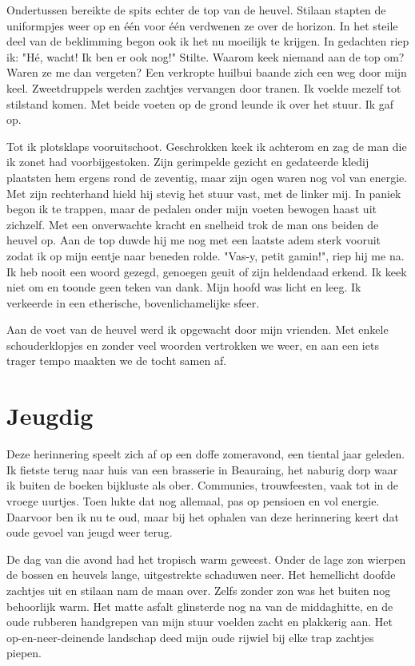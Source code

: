 \documentclass[12pt, justified, a4paper, symmetric]{tufte-book}
\begin{document}
Ondertussen bereikte de spits echter de top van de heuvel. Stilaan stapten de uniformpjes weer op en \'e\'en voor \'e\'en verdwenen ze over de horizon. In het steile deel van de beklimming begon ook ik het nu moeilijk te krijgen. In gedachten riep ik: "H\'e, wacht! Ik ben er ook nog!" Stilte. Waarom keek niemand aan de top om? Waren ze me dan vergeten? Een verkropte huilbui baande zich een weg door mijn keel. Zweetdruppels werden zachtjes vervangen door tranen. Ik voelde mezelf tot stilstand komen. Met beide voeten op de grond leunde ik over het stuur. Ik gaf op.

Tot ik plotsklaps vooruitschoot. Geschrokken keek ik achterom en zag de man die ik zonet had voorbijgestoken. Zijn gerimpelde gezicht en gedateerde kledij plaatsten hem ergens rond de zeventig, maar zijn ogen waren nog vol van energie. Met zijn rechterhand hield hij stevig het stuur vast, met de linker mij. In paniek begon ik te trappen, maar de pedalen onder mijn voeten bewogen haast uit zichzelf. Met een onverwachte kracht en snelheid trok de man ons beiden de heuvel op. Aan de top duwde hij me nog met een laatste adem sterk vooruit zodat ik op mijn eentje naar beneden rolde. "Vas-y, petit gamin!", riep hij me na. Ik heb nooit een woord gezegd, genoegen geuit of zijn heldendaad erkend. Ik keek niet om en toonde geen teken van dank. Mijn hoofd was licht en leeg. Ik verkeerde in een etherische, bovenlichamelijke sfeer.

Aan de voet van de heuvel werd ik opgewacht door mijn vrienden. Met enkele schouderklopjes en zonder veel woorden vertrokken we weer, en aan een iets trager tempo maakten we de tocht samen af.

\section{Jeugdig}
Deze herinnering speelt zich af op een doffe zomeravond, een tiental jaar geleden. Ik fietste terug naar huis van een brasserie in Beauraing, het naburig dorp waar ik buiten de boeken bijkluste als ober. Communies, trouwfeesten, vaak tot in de vroege uurtjes. Toen lukte dat nog allemaal, pas op pensioen en vol energie. Daarvoor ben ik nu te oud, maar bij het ophalen van deze herinnering keert dat oude gevoel van jeugd weer terug.

De dag van die avond had het tropisch warm geweest. Onder de lage zon wierpen de bossen en heuvels lange, uitgestrekte schaduwen neer. Het hemellicht doofde zachtjes uit en stilaan nam de maan over. Zelfs zonder zon was het buiten nog behoorlijk warm. Het matte asfalt glinsterde nog na van de middaghitte, en de oude rubberen handgrepen van mijn stuur voelden zacht en plakkerig aan. Het op-en-neer-deinende landschap deed mijn oude rijwiel bij elke trap zachtjes piepen.
\end{document}
